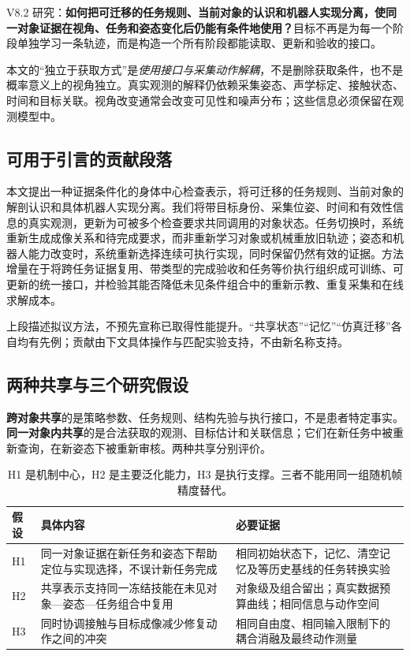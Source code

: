 \documentclass[UTF8,11pt,a4paper,fontset=fandol]{ctexart}
\numberwithin{equation}{section}
\theoremstyle{definition}
\begin{document}
V8.2 研究：\textbf{如何把可迁移的任务规则、当前对象的认识和机器人实现分离，使同一对象证据在视角、任务和姿态变化后仍能有条件地使用？}目标不再是为每一个阶段单独学习一条轨迹，而是构造一个所有阶段都能读取、更新和验收的接口。

本文的“独立于获取方式”是\emph{使用接口与采集动作解耦}，不是删除获取条件，也不是概率意义上的视角独立。真实观测的解释仍依赖采集姿态、声学标定、接触状态、时间和目标关联。视角改变通常会改变可见性和噪声分布；这些信息必须保留在观测模型中。

\subsection{可用于引言的贡献段落}
\begin{keybox}
本文提出一种证据条件化的身体中心检查表示，将可迁移的任务规则、当前对象的解剖认识和具体机器人实现分离。我们将带目标身份、采集位姿、时间和有效性信息的真实观测，更新为可被多个检查要求共同调用的对象状态。任务切换时，系统重新生成成像关系和待完成要求，而非重新学习对象或机械重放旧轨迹；姿态和机器人能力改变时，系统重新选择连续可执行实现，同时保留仍然有效的证据。方法增量在于将跨任务证据复用、带类型的完成验收和任务等价执行组织成可训练、可更新的统一接口，并检验其能否降低未见条件组合中的重新示教、重复采集和在线求解成本。
\end{keybox}
上段描述拟议方法，不预先宣称已取得性能提升。“共享状态”“记忆”“仿真迁移”各自均有先例；贡献由下文具体操作与匹配实验支持，不由新名称支持。

\subsection{两种共享与三个研究假设}
\textbf{跨对象共享}的是策略参数、任务规则、结构先验与执行接口，不是患者特定事实。\textbf{同一对象内共享}的是合法获取的观测、目标估计和关联信息；它们在新任务中被重新查询，在新姿态下被重新审核。两种共享分别评价。

\begin{table}[htbp]\centering\small
\begin{tabularx}{\linewidth}{P{12mm}YY}
\toprule
假设 & 具体内容 & 必要证据\\\midrule
H1 & 同一对象证据在新任务和姿态下帮助定位与实现选择，不误计新任务完成 & 相同初始状态下，记忆、清空记忆及等历史基线的任务转换实验\\
H2 & 共享表示支持同一冻结技能在未见对象—姿态—任务组合中复用 & 对象级及组合留出；真实数据预算曲线；相同信息与动作空间\\
H3 & 同时协调接触与目标成像减少修复动作之间的冲突 & 相同自由度、相同输入限制下的耦合消融及最终动作测量\\\bottomrule
\end{tabularx}
\caption{H1 是机制中心，H2 是主要泛化能力，H3 是执行支撑。三者不能用同一组随机帧精度替代。}
\end{table}
\end{document}
